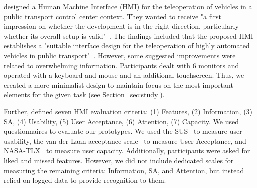 \citet{kettwich_teleoperation_2021} designed a Human Machine Interface (HMI) for the teleoperation of vehicles in a public transport control center context. %
They wanted to receive "a first impression on whether the development is in the right direction, particularly whether its overall setup is valid"~\cite[p. 19]{kettwich_teleoperation_2021}.
The findings included that the proposed HMI establishes a "suitable interface design for the teleoperation of highly automated vehicles in public transport"~\cite[p. 15]{kettwich_teleoperation_2021}. However, some suggested improvements were related to overwhelming information. Participants dealt with 6 monitors and operated with a keyboard and mouse and an additional touchscreen. Thus, we created a more minimalist design to maintain focus on the most important elements for the given task (see Section~\ref{sec:study}).

Further, \citet{kettwich_teleoperation_2021} defined seven HMI evaluation criteria: (1) Features, (2) Information, (3) SA, (4) Usability, (5) User Acceptance, (6) Attention, (7) Capacity. We used questionnaires to evaluate our prototypes. We used the SUS~\cite{brooke1996sus} to measure user usability, the van der Laan acceptance scale~\cite{VANDERLAAN19971} to measure User Acceptance, and NASA-TLX~\cite{hart1988development} to measure user capacity. Additionally, participants were asked for liked and missed features. However, we did not include dedicated scales for measuring the remaining criteria: Information, SA, and Attention, but instead relied on logged data to provide recognition to them. %






